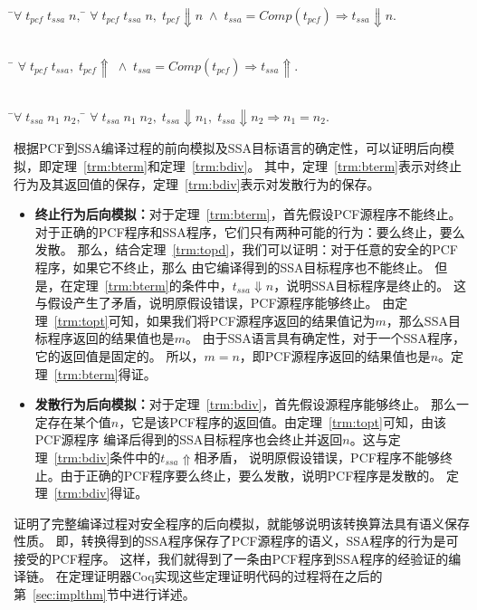   \begin{theorem}[SSA程序对PCF程序终止行为的保存]\label{trm:topt} 
    \begin{tabbing}
     \\
    \quad\=$\forall \; t_{pcf}\; t_{ssa}\; n,\; $\=\kill
    \>$\forall \; t_{pcf}\; t_{ssa}\; n,\; t_{pcf}\Downarrow n\; \wedge \; t_{ssa}=Comp(t_{pcf}) \Longrightarrow t_{ssa}\Downarrow n.$
    \end{tabbing}
  \end{theorem}
  
  \begin{theorem}[SSA程序对PCF程序发散行为的保存]\label{trm:topd}
    \begin{tabbing}
      \\
    \quad\=\kill
    \>$\forall \; t_{pcf}\; t_{ssa},\; t_{pcf}\Uparrow\; \wedge \; t_{ssa}=Comp(t_{pcf})\Longrightarrow t_{ssa}\Uparrow.$
    \end{tabbing}
  \end{theorem}  

  \begin{theorem}[SSA语言的确定性]\label{trm:ssadeter} 
    \begin{tabbing}
     \\
    \quad\=$\forall \; t_{ssa}\; n_1\; n_2,\; $\=\kill
    \>$\forall \; t_{ssa}\; n_1\; n_2,\; t_{ssa}\Downarrow n_1,\; t_{ssa}\Downarrow n_2 \Longrightarrow n_1 = n_2.$
    \end{tabbing}
  \end{theorem}

根据PCF到SSA编译过程的前向模拟及SSA目标语言的确定性，可以证明后向模拟，即定理~\ref{trm:bterm}和定理~\ref{trm:bdiv}。
其中，定理~\ref{trm:bterm}表示对终止行为及其返回值的保存，定理~\ref{trm:bdiv}表示对发散行为的保存。

\begin{itemize}
  \item \textbf{终止行为后向模拟：}对于定理~\ref{trm:bterm}，首先假设PCF源程序不能终止。
    对于正确的PCF程序和SSA程序，它们只有两种可能的行为：要么终止，要么发散。
    那么，结合定理~\ref{trm:topd}，我们可以证明：对于任意的安全的PCF程序，如果它不终止，那么
    由它编译得到的SSA目标程序也不能终止。
    但是，在定理~\ref{trm:bterm}的条件中，$t_{ssa}\Downarrow n$，说明SSA目标程序是终止的。
    这与假设产生了矛盾，说明原假设错误，PCF源程序能够终止。
    由定理~\ref{trm:topt}可知，如果我们将PCF源程序返回的结果值记为$m$，那么SSA目标程序返回的结果值也是$m$。
    由于SSA语言具有确定性，对于一个SSA程序，它的返回值是固定的。
    所以，$m=n$，即PCF源程序返回的结果值也是$n$。定理~\ref{trm:bterm}得证。
  \item \textbf{发散行为后向模拟：}对于定理~\ref{trm:bdiv}，首先假设源程序能够终止。
    那么一定存在某个值$n$，它是该PCF程序的返回值。由定理~\ref{trm:topt}可知，由该PCF源程序
    编译后得到的SSA目标程序也会终止并返回$n$。这与定理~\ref{trm:bdiv}条件中的$t_{ssa}\Uparrow$相矛盾，
    说明原假设错误，PCF程序不能够终止。由于正确的PCF程序要么终止，要么发散，说明PCF程序是发散的。
    定理~\ref{trm:bdiv}得证。
\end{itemize}

证明了完整编译过程对安全程序的后向模拟，就能够说明该转换算法具有语义保存性质。
即，转换得到的SSA程序保存了PCF源程序的语义，SSA程序的行为是可接受的PCF程序。
这样，我们就得到了一条由PCF程序到SSA程序的经验证的编译链。
在定理证明器Coq实现这些定理证明代码的过程将在之后的第~\ref{sec:implthm}节中进行详述。
